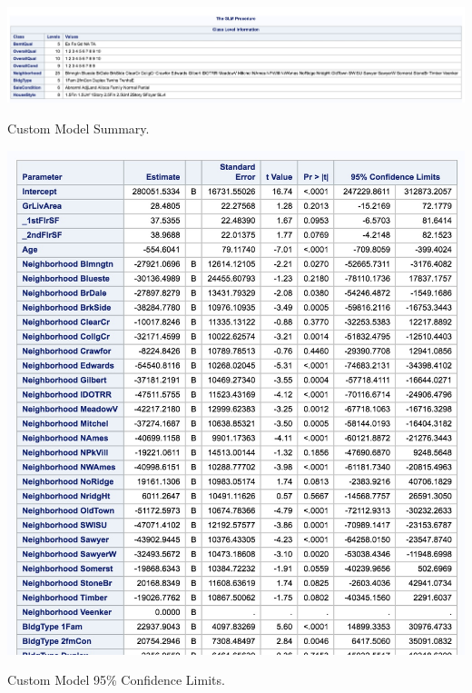 \documentclass[11pt]{scrartcl} %
\begin{document}
\begin{table}[H] %
	\centering %
	\includegraphics[scale=.25]{../graphics/A2Custfeatures}
	\caption{Custom Model Summary.}
	\label{tab:A2Custsummary}
\end{table}
\hrulefill
\begin{table}[H] %
	\centering %
	\includegraphics[scale=.3]{../graphics/A2CustCI}
	\caption{Custom Model 95\% Confidence Limits.}
	\label{tab:A2CustCI}
\end{table}
\hrulefill
\end{document}
